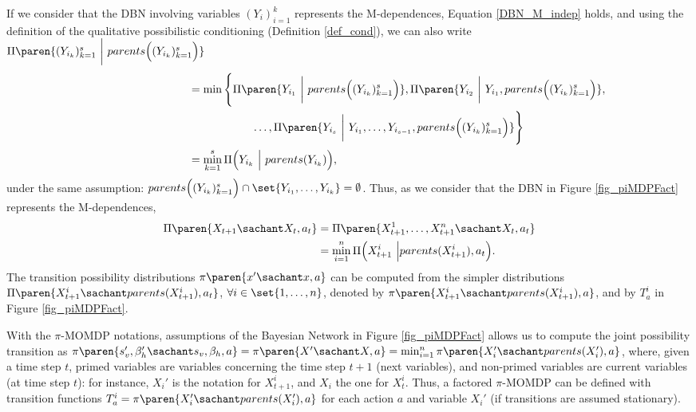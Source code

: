 If we consider that the DBN involving variables $(Y_i)_{i=1}^k$ 
represents the M-dependences, 
Equation \ref{DBN_M_indep} holds, 
and using the definition 
of the qualitative possibilistic conditioning 
(Definition \ref{def_cond}),
we can also write \\
$\Pi \paren{ (Y_{i_k})_{k=1}^s \ \bigg\vert \  parents \Big( (Y_{i_k})_{k=1}^s \Big)  }$
\begin{align*}
\hspace{3cm} &= \min \Bigg\{ \Pi \paren{ Y_{i_1} \ \bigg\vert \  parents \Big( (Y_{i_k})_{k=1}^s \Big)  }, \Pi \paren{ Y_{i_2} \ \bigg\vert \  Y_{i_1}, parents \Big( (Y_{i_k})_{k=1}^s \Big)  }, \\
&\hspace{2cm} \ldots, \Pi \paren{ Y_{i_s} \ \bigg\vert \ Y_{i_1}, \ldots, Y_{i_{s-1}},  parents \Big( (Y_{i_k})_{k=1}^s \Big)  } \Bigg\}  \\
&= \min_{k=1}^s \Pi \Big( Y_{i_k} \ \Big\vert \ parents(Y_{i_k})   \Big),
\end{align*}
under the same assumption: $parents \Big( (Y_{i_k})_{k=1}^s \Big) \cap \set{Y_{i_1},\ldots,Y_{i_k}} = \emptyset$. 
Thus, as we consider that 
the DBN in Figure \ref{fig_piMDPFact}
represents the M-dependences,
\begin{align*}
\Pi \paren{ X_{t+1} \sachant X_t, a_t } &= \Pi \paren{ X^1_{t+1}, \ldots, X^n_{t+1} \sachant X_t, a_t }\\
&= \min_{i=1}^{n} \Pi \Big( X^i_{t+1} \ \Big\vert parents(X^i_{t+1}), a_t \Big). 
\end{align*}
The transition possibility distributions $\pi \paren{x' \sachant x,a}$ 
can be computed from the simpler distributions 
$\Pi \paren{ X^i_{t+1} \sachant parents(X^i_{t+1}), a_t  }$, $\forall i \in \set{1,\ldots,n}$,
denoted by $\pi \paren{ X^i_{t+1} \sachant parents(X^i_{t+1}), a }$,
and by $T^i_a$ in Figure \ref{fig_piMDPFact}.

With the $\pi$-MOMDP notations, assumptions of the Bayesian Network
in Figure \ref{fig_piMDPFact}
allows us to compute the joint possibility transition as 
$\pi \paren{s_v',\beta_h' \sachant s_v,\beta_h,a} = \pi \paren{ X' \sachant X,a } = \min_{i=1}^{n} \pi \paren{ X_i' \sachant parents(X_i'),a}$,
where, given a time step $t$, 
primed variables are variables concerning the time step $t+1$
(next variables), and non-primed variables are current variables 
(at time step $t$): for instance, 
$X_i'$ is the notation for $X^i_{t+1}$,
and $X_i$ the one for $X_t^i$.
Thus, a factored $\pi$-MOMDP can be defined 
with transition functions $T^i_a= \pi \paren{X_i' \sachant parents(X_i'),a }$ 
for each action $a$ and variable $X_i'$
(if transitions are assumed stationary).

